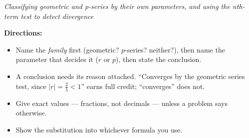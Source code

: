 \documentclass[12pt]{article}
\begin{document}

\begin{center}\small\textit{Classifying geometric and p-series by their own parameters,
and using the nth-term test to detect divergence}\end{center}

\noindent\small\textbf{Directions:}
\begin{itemize}[label={$\bullet$}, leftmargin=1.1cm, itemsep=1pt, topsep=2pt]
  \item Name the \emph{family} first (geometric? $p$-series? neither?), then name the
        parameter that decides it ($r$ or $p$), then state the conclusion.
  \item A conclusion needs its reason attached. ``Converges by the geometric series test,
        since $|r| = \tfrac{2}{5} < 1$'' earns full credit; ``converges'' does not.
  \item Give exact values --- fractions, not decimals --- unless a problem says otherwise.
  \item Show the substitution into whichever formula you use.
\end{itemize}
\normalsize
\end{document}
